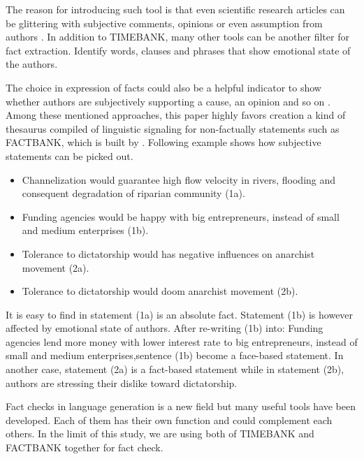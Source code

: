 The reason for introducing such tool is that even scientific research articles can be glittering with subjective comments, opinions or even assumption from authors \cite{schultze2000confessional}. In addition to TIMEBANK, many other tools can be another filter for fact extraction. \cite{Dave2003mining} Identify words, clauses and phrases that show emotional state of the authors. 

The choice in expression of facts could also be a helpful indicator to show whether authors are subjectively supporting a cause, an opinion and so on \cite{Wiebe2005}. Among these mentioned approaches, this paper highly favors creation a kind of thesaurus compiled of linguistic signaling for non-factually statements such as FACTBANK, which is built by \cite{Sauri2009}. 
Following example shows how subjective statements can be picked out.

\begin{itemize}
	\item Channelization would guarantee high flow velocity in rivers, flooding and consequent degradation of riparian community (1a).
	\item Funding agencies would be happy with big entrepreneurs, instead of small and medium enterprises (1b).
	\item Tolerance to dictatorship would has negative influences on anarchist movement (2a).
	\item Tolerance to dictatorship would doom anarchist movement (2b).
\end{itemize}

It is easy to find in statement (1a) is an absolute fact. 
Statement (1b) is however affected by emotional state of authors. 
After re-writing (1b) into: Funding agencies lend more money with lower interest rate to big entrepreneurs, instead of small 
and medium enterprises,sentence (1b) become a face-based statement. 
In another case, statement (2a) is a fact-based statement while in statement (2b), authors are stressing their dislike toward dictatorship.

Fact checks in language generation is a new field but many useful tools have been developed. Each of them has their own function and could complement each others. In the limit of this study, we are using both of TIMEBANK and FACTBANK together for fact check.


